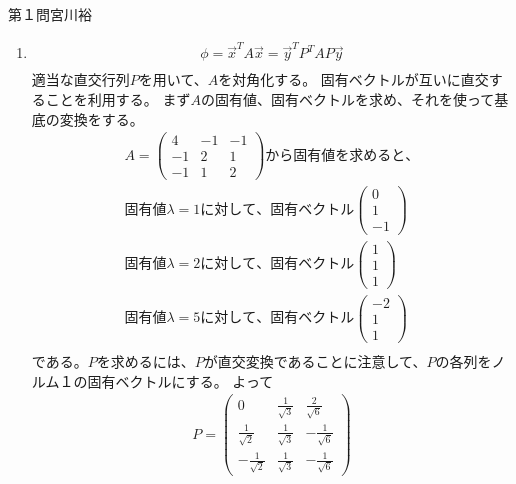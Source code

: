 \documentclass[fleqn]{jbook}
\begin{document}
\begin{answer}{第１問}{宮川裕}
\begin{enumerate}
\item{}
  \begin{eqnarray*}
    \phi =\vec{x}^T A \vec{x} = \vec{y}^T P^T A P \vec{y}\\
  \end{eqnarray*}
  適当な直交行列$P$を用いて、$A$を対角化する。
  固有ベクトルが互いに直交することを利用する。
  まず$A$の固有値、固有ベクトルを求め、それを使って基底の変換をする。
  \begin{eqnarray*}
    A=\begin{pmatrix}
      4 & -1 & -1 \\
      -1 & 2  & 1  \\
      -1 & 1  & 2
    \end{pmatrix}から固有値を求めると、\\
    固有値\lambda =1に対して、固有ベクトル\begin{pmatrix} 0 \\ 1 \\ -1 \end{pmatrix}\\
    固有値\lambda =2に対して、固有ベクトル\begin{pmatrix} 1 \\ 1 \\  1 \end{pmatrix}\\
    固有値\lambda =5に対して、固有ベクトル\begin{pmatrix} -2 \\ 1 \\  1 \end{pmatrix}\\
  \end{eqnarray*}
  である。$P$を求めるには、$P$が直交変換であることに注意して、$P$の各列をノルム１の固有ベクトルにする。
  よって
  \begin{eqnarray*}
    P=\begin{pmatrix}
      0 & \frac{1}{\sqrt3} & \frac{2}{\sqrt6} \\
      \frac{1}{\sqrt2} & \frac{1}{\sqrt3}  & -\frac{1}{\sqrt6}  \\
      -\frac{1}{\sqrt2} & \frac{1}{\sqrt3}  & -\frac{1}{\sqrt6}
    \end{pmatrix}
  \end{eqnarray*}


\end{enumerate}
\end{answer}
\end{document}
